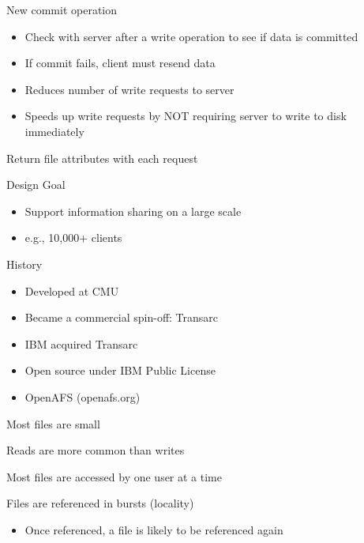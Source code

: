 \begin{slide}

	
	New commit operation
	\begin{itemize}
		\item Check with server after a write operation to see if data is committed 
		\item If commit fails, client must resend data 
		\item Reduces number of write requests to server 
		\item Speeds up write requests by NOT requiring server to write to disk immediately
	\end{itemize}
	\medskip
	
	Return file attributes with each request
	
\end{slide}

\begin{slide}

\end{slide}

\begin{slide}

	
	Design Goal
	\begin{itemize}
		\item Support information sharing on a large scale 
		\item e.g., 10,000+ clients 
	\end{itemize}
	\medskip
	
	History
	\begin{itemize}
		\item Developed at CMU 
		\item Became a commercial spin-off: Transarc 
		\item IBM acquired Transarc 
		\item Open source under IBM Public License 
		\item OpenAFS (openafs.org) 
	\end{itemize}
	
\end{slide}

\begin{slide}

	
	Most files are small 
	\medskip
	
	Reads are more common than writes 
	\medskip
	
	Most files are accessed by one user at a time
	\medskip
	
	Files are referenced in bursts (locality)
	\begin{itemize}
		\item Once referenced, a file is likely to be referenced again 
	\end{itemize}
	
\end{slide}

